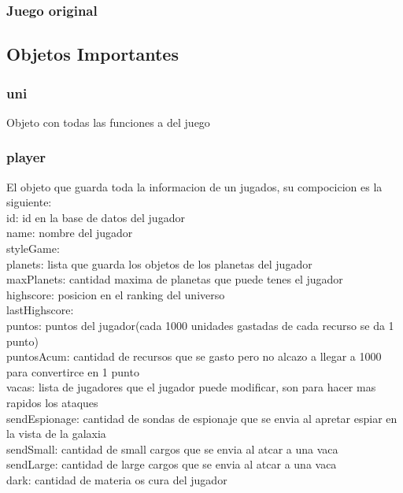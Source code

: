 \documentclass{article}
\newcommand\tab[1][1cm]{\hspace*{#1}}
\begin{document}
        \subsubsection{Juego original}
    \subsection{Objetos Importantes}
        \subsubsection{uni} Objeto con todas las funciones a del juego
        \subsubsection{player} El objeto que guarda toda la informacion de un jugados, su compocicion es la siguiente: \\
            \tab id: id en la base de datos del jugador \\
            \tab name: nombre del jugador \\
            \tab styleGame: \\
            \tab planets: lista que guarda los objetos de los planetas del jugador \\
            \tab maxPlanets: cantidad maxima de planetas que puede tenes el jugador \\
            \tab highscore: posicion en el ranking del universo\\
            \tab lastHighscore: \\
            \tab puntos: puntos del jugador(cada 1000 unidades gastadas de cada recurso se da 1 punto)\\
            \tab puntosAcum: cantidad de recursos que se gasto pero no alcazo a llegar a 1000 para convertirce en 1 punto\\
            \tab vacas: lista de jugadores que el jugador puede modificar, son para hacer mas rapidos los ataques\\
            \tab sendEspionage: cantidad de sondas de espionaje que se envia al apretar espiar en la vista de la galaxia\\
            \tab sendSmall: cantidad de small cargos que se envia al atcar a una vaca \\
            \tab sendLarge: cantidad de large cargos que se envia al atcar a una vaca\\
            \tab dark: cantidad de materia os   cura del jugador  \\
\end{document}
